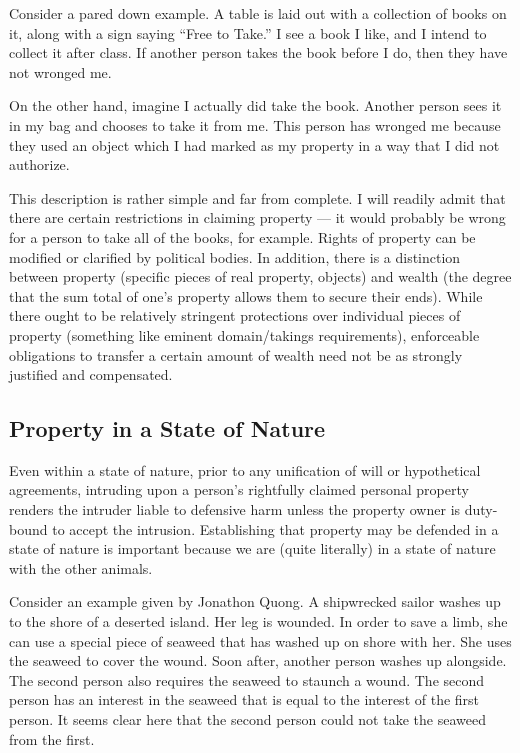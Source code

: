 	Consider a pared down example. A table is laid out with a collection of
	books on it, along with a sign saying “Free to Take.” I see a book I like,
	and I intend to collect it after class. If another person takes the book
	before I do, then they have not wronged me.

	On the other hand, imagine I actually did take the book. Another person
	sees it in my bag and chooses to take it from me. This person has wronged
	me because they used an object which I had marked as my property in a way
	that I did not authorize.

	This description is rather simple and far from complete. I will readily
	admit that there are certain restrictions in claiming property --- it would
	probably be wrong for a person to take all of the books, for example. Rights
	of property can be modified or clarified by political bodies. In addition,
	there is a distinction between property (specific pieces of real property,
	objects) and wealth (the degree that the sum total of one’s property allows
	them to secure their ends). While there ought to be relatively stringent
	protections over individual pieces of property (something like eminent
	domain/takings requirements), enforceable obligations to transfer a certain
	amount of wealth need not be as strongly justified and compensated.

	\subsection{Property in a State of Nature}

	Even within a state of nature, prior to any unification of will or
	hypothetical agreements, intruding upon a person’s rightfully claimed
	personal property renders the intruder liable to defensive harm unless the
	property owner is duty-bound to accept the intrusion.  Establishing that
	property may be defended in a state of nature is important because we are
	(quite literally) in a state of nature with the other animals. 

	Consider an example given by Jonathon Quong.  A shipwrecked sailor washes
	up to the shore of a deserted island. Her leg is wounded. In order to save
	a limb, she can use a special piece of seaweed that has washed up on shore
	with her. She uses the seaweed to cover the wound. Soon after, another
	person washes up alongside. The second person also requires the seaweed to
	staunch a wound. The second person has an interest in the seaweed that is
	equal to the interest of the first person. It seems clear here that the
	second person could not take the seaweed from the first.\autocite[92]{quong}

